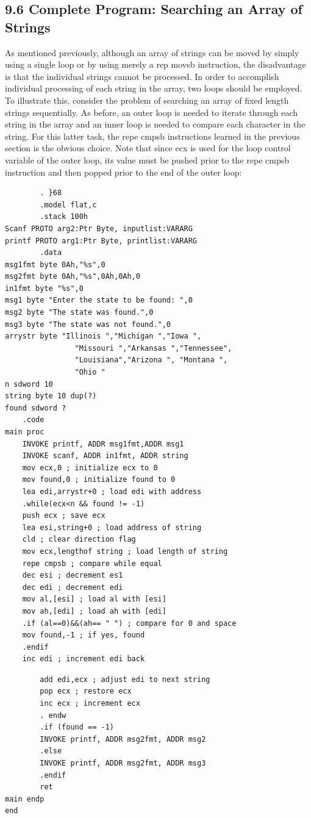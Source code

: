 \documentclass[10pt]{book}
\begin{document}
\subsection*{9.6 Complete Program: Searching an Array of Strings}
As mentioned previously, although an array of strings can be moved by simply using a single loop or by using merely a rep movsb instruction, the disadvantage is that the individual strings cannot be processed. In order to accomplish individual processing of each string in the array, two loops should be employed. To illustrate this, consider the problem of searching an array of fixed length strings sequentially. As before, an outer loop is needed to iterate through each string in the array and an inner loop is needed to compare each character in the string. For this latter task, the repe cmpsb instructions learned in the previous section is the obvious choice. Note that since ecx is used for the loop control variable of the outer loop, its value must be pushed prior to the repe cmpsb instruction and then popped prior to the end of the outer loop:

\begin{verbatim}
        . }68
        .model flat,c
        .stack 100h
Scanf PROTO arg2:Ptr Byte, inputlist:VARARG
printf PROTO arg1:Ptr Byte, printlist:VARARG
        .data
msg1fmt byte 0Ah,"%s",0
msg2fmt byte 0Ah,"%s",0Ah,0Ah,0
in1fmt byte "%s",0
msg1 byte "Enter the state to be found: ",0
msg2 byte "The state was found.",0
msg3 byte "The state was not found.",0
arrystr byte "Illinois ","Michigan ","Iowa ",
                "Missouri ","Arkansas ","Tennessee",
                "Louisiana","Arizona ", "Montana ",
                "Ohio "
n sdword 10
string byte 10 dup(?)
found sdword ?
    .code
main proc
    INVOKE printf, ADDR msg1fmt,ADDR msg1
    INVOKE scanf, ADDR in1fmt, ADDR string
    mov ecx,0 ; initialize ecx to 0
    mov found,0 ; initialize found to 0
    lea edi,arrystr+0 ; load edi with address
    .while(ecx<n && found != -1)
    push ecx ; save ecx
    lea esi,string+0 ; load address of string
    cld ; clear direction flag
    mov ecx,lengthof string ; load length of string
    repe cmpsb ; compare while equal
    dec esi ; decrement es1
    dec edi ; decrement edi
    mov al,[esi] ; load al with [esi]
    mov ah,[edi] ; load ah with [edi]
    .if (al==0)&&(ah== " ") ; compare for 0 and space
    mov found,-1 ; if yes, found
    .endif
    inc edi ; increment edi back
\end{verbatim}

\begin{verbatim}
        add edi,ecx ; adjust edi to next string
        pop ecx ; restore ecx
        inc ecx ; increment ecx
        . endw
        .if (found == -1)
        INVOKE printf, ADDR msg2fmt, ADDR msg2
        .else
        INVOKE printf, ADDR msg2fmt, ADDR msg3
        .endif
        ret
main endp
end
\end{verbatim}
\end{document}
